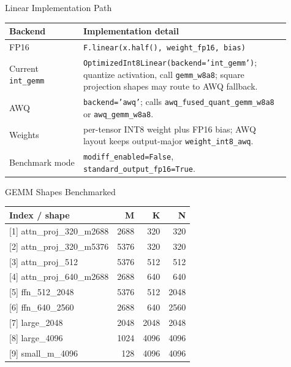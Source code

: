 \documentclass[aspectratio=169]{beamer}
\begin{document}
\begin{frame}{Linear Implementation Path}
\small
\begin{tabular}{p{0.24\linewidth}p{0.67\linewidth}}
\toprule
Backend & Implementation detail \\
\midrule
FP16 & \texttt{F.linear(x.half(), weight\_fp16, bias)} \\
Current \texttt{int\_gemm} & \texttt{OptimizedInt8Linear(backend='int\_gemm')}; quantize activation, call \texttt{gemm\_w8a8}; square projection shapes may route to AWQ fallback. \\
AWQ & \texttt{backend='awq'}; calls \texttt{awq\_fused\_quant\_gemm\_w8a8} or \texttt{awq\_gemm\_w8a8}. \\
Weights & per-tensor INT8 weight plus FP16 bias; AWQ layout keeps output-major \texttt{weight\_int8\_awq}. \\
Benchmark mode & \texttt{modiff\_enabled=False}, \texttt{standard\_output\_fp16=True}. \\
\bottomrule
\end{tabular}
\end{frame}

\begin{frame}{GEMM Shapes Benchmarked}
\small
\begin{tabular}{lrrr}
\toprule
Index / shape & M & K & N \\
\midrule
{[1]} attn\_proj\_320\_m2688 & 2688 & 320 & 320 \\
{[2]} attn\_proj\_320\_m5376 & 5376 & 320 & 320 \\
{[3]} attn\_proj\_512 & 5376 & 512 & 512 \\
{[4]} attn\_proj\_640\_m2688 & 2688 & 640 & 640 \\
{[5]} ffn\_512\_2048 & 5376 & 512 & 2048 \\
{[6]} ffn\_640\_2560 & 2688 & 640 & 2560 \\
{[7]} large\_2048 & 2048 & 2048 & 2048 \\
{[8]} large\_4096 & 1024 & 4096 & 4096 \\
{[9]} small\_m\_4096 & 128 & 4096 & 4096 \\
\bottomrule
\end{tabular}
\end{frame}
\end{document}
